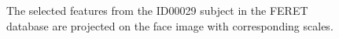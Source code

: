 \begin{figure}[ht]
\begin{center}
\caption{The selected features from the ID00029 subject in the \mbox{FERET} database are projected on the face image with corresponding scales.}
\label{fig:feretfeatures}
\end{center}
\end{figure} 
